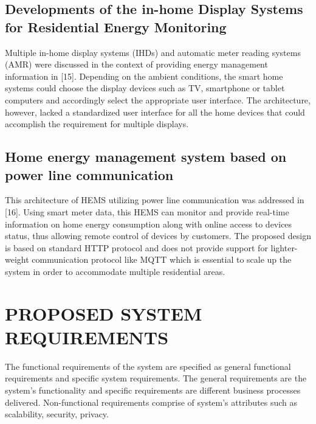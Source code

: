 \documentclass[a4paper,12pt,oneside]{article}
\begin{document}
\newpage
\subsection{Developments of the in-home Display Systems for Residential Energy Monitoring}
Multiple in-home display systems (IHDs) and automatic
meter reading systems (AMR) were discussed in the context of
providing energy management information in [15]. Depending
on the ambient conditions, the smart home systems could
choose the display devices such as TV, smartphone or tablet
computers and accordingly select the appropriate user
interface. The architecture, however, lacked a standardized
user interface for all the home devices that could accomplish
the requirement for multiple displays.

\subsection{Home energy management system based on power line communication}
This architecture of HEMS utilizing power line communication was addressed
in [16]. Using smart meter data, this HEMS can monitor and provide real-time information on home energy consumption
along with online access to devices status, thus allowing
remote control of devices by customers. The proposed design
is based on standard HTTP protocol and does not provide
support for lighter-weight communication protocol like
MQTT which is essential to scale up the system in order to
accommodate multiple residential areas.



\newpage
\section{PROPOSED SYSTEM REQUIREMENTS}
The functional requirements of the system are specified as
general functional requirements and specific system
requirements. The general requirements are the system’s
functionality and specific requirements are different business
processes delivered. Non-functional requirements comprise of
system’s attributes such as scalability, security, privacy.
\end{document}
